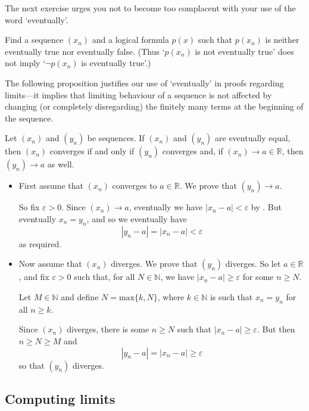 The next exercise urges you not to become too complacent with your use of the word `eventually'.

\begin{exercise}
Find a sequence $(x_n)$ and a logical formula $p(x)$ such that $p(x_n)$ is neither eventually true nor eventually false. (Thus `$p(x_n)$ is not eventually true' does not imply `$\neg p(x_n)$ is eventually true'.)
\end{exercise}

The following proposition justifies our use of `eventually' in proofs regarding limits---it implies that limiting behaviour of a sequence is not affected by changing (or completely disregarding) the finitely many terms at the beginning of the sequence.

\begin{theorem}
Let $(x_n)$ and $(y_n)$ be sequences. If $(x_n)$ and $(y_n)$ are eventually equal, then $(x_n)$ converges if and only if $(y_n)$ converges and, if $(x_n) \to a \in \mathbb{R}$, then $(y_n) \to a$ as well.
\end{theorem}

\begin{cproof}
\fixlistskip
\begin{itemize}
\item First assume that $(x_n)$ converges to $a \in \mathbb{R}$. We prove that $(y_n) \to a$.

So fix $\varepsilon > 0$. Since $(x_n) \to a$, eventually we have $|x_n - a| < \varepsilon$ by . But eventually $x_n = y_n$, and so we eventually have
\[ |y_n - a| = |x_n - a| < \varepsilon \]
as required.

\item Now assume that $(x_n)$ diverges. We prove that $(y_n)$ diverges. So let $a \in \mathbb{R}$, and fix $\varepsilon > 0$ such that, for all $N \in \mathbb{N}$, we have $|x_n - a| \ge \varepsilon$ for some $n \ge N$.

Let $M \in \mathbb{N}$ and define $N = \mathrm{max} \{ k, N \}$, where $k \in \mathbb{N}$ is such that $x_n=y_n$ for all $n \ge k$.

Since $(x_n)$ diverges, there is some $n \ge N$ such that $|x_n - a| \ge \varepsilon$. But then $n \ge N \ge M$ and
\[ |y_n - a| = |x_n - a| \ge \varepsilon \]
so that $(y_n)$ diverges.
\end{itemize}
\end{cproof}

\subsection*{Computing limits}

